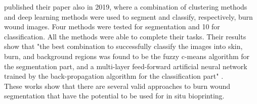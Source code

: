 \citeauthor{Sevik2019_automatic_classification_skin_burn_texture_base_feature_extraction} published their paper also in 2019, where a combination of clustering methods and deep learning methods were used to segment and classify, respectively, burn wound images. Four methods were tested for segmentation and 10 for classification. All the methods were able to complete their tasks. Their results show that "the best combination to successfully classify the images into skin, burn, and background regions was found to be the fuzzy c-means algorithm for the segmentation part, and a multi-layer feed-forward artificial neural network trained by the back-propagation algorithm for the classification part" \cite{Sevik2019_automatic_classification_skin_burn_texture_base_feature_extraction}.\\

These works show that there are several valid approaches to burn wound segmentation that have the potential to be used for in situ bioprinting.

